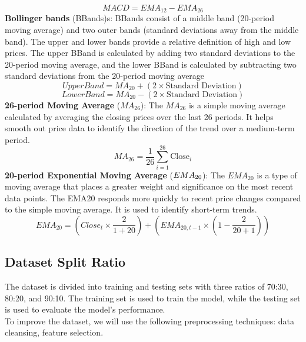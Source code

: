 \documentclass{ieeeojies}
\begin{document}
\begin{dmath*}
    MACD = EMA_{12} - EMA_{26}
\end{dmath*}
\textbf{Bollinger bands} (BBands)s: BBands consist of a middle band (20-period moving average) and two outer bands (standard deviations away from the middle band). The upper and lower bands provide a relative definition of high and low prices. The upper BBand is calculated by adding two standard deviations to the 20-period moving average, and the lower BBand is calculated by subtracting two standard deviations from the 20-period moving average
\begin{dmath*}
    Upper Band = MA_{20} + (2 \times \text{Standard Deviation})
\end{dmath*}
\begin{dmath*}
    Lower Band = MA_{20} - (2 \times \text{Standard Deviation})
\end{dmath*}
\noindent
\textbf{26-period Moving Average} (\(MA_{26}\)): The \(MA_{26}\) is a simple moving average calculated by averaging the closing prices over the last 26 periods. It helps smooth out price data to identify the direction of the trend over a medium-term period.
\begin{dmath*}
    MA_{26} = \frac{1}{26} \sum_{i=1}^{26} \text{Close}_i
\end{dmath*}
\noindent
\textbf{20-period Exponential Moving Average} (\(\textbf{EMA}_{\textnormal{20}}\)): The \(EMA_{20}\) is a type of moving average that places a greater weight and significance on the most recent data points. The EMA20 responds more quickly to recent price changes compared to the simple moving average. It is used to identify short-term trends.
\begin{dmath*}
    EMA_{20} = (Close_t \times \frac{2}{1+20}) + (EMA_{20,t-1} \times (1-\frac{2}{20+1}))
\end{dmath*}
\subsection {Dataset Split Ratio}
The dataset is divided into training and testing sets with three ratios of 70:30, 80:20, and 90:10. The training set is used to train the model, while the testing set is used to evaluate the model's performance.\\
To improve the dataset, we will use the following preprocessing techniques: data cleansing, feature selection.
\end{document}
